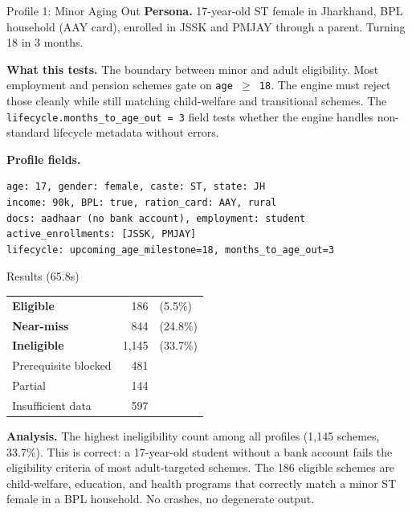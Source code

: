 \documentclass[11pt,a4paper]{article}
\newcommand{\ic}[1]{\texttt{\color{accent}#1}}
\begin{document}
\begin{profilebox}{Profile 1: Minor Aging Out}
\textbf{Persona.} 17-year-old ST female in Jharkhand, BPL household (AAY card), enrolled in JSSK and PMJAY through a parent. Turning 18 in 3 months.

\textbf{What this tests.} The boundary between minor and adult eligibility. Most employment and pension schemes gate on \ic{age $\geq$ 18}. The engine must reject those cleanly while still matching child-welfare and transitional schemes. The \ic{lifecycle.months\_to\_age\_out = 3} field tests whether the engine handles non-standard lifecycle metadata without errors.

\textbf{Profile fields.}
\begin{lstlisting}
age: 17, gender: female, caste: ST, state: JH
income: 90k, BPL: true, ration_card: AAY, rural
docs: aadhaar (no bank account), employment: student
active_enrollments: [JSSK, PMJAY]
lifecycle: upcoming_age_milestone=18, months_to_age_out=3
\end{lstlisting}

\begin{resultbox}{Results (65.8s)}
\begin{tabular}{@{}lrl@{}}
  \textcolor{eligible}{\textbf{Eligible}} & 186 & (5.5\%) \\
  \textcolor{nearmiss}{\textbf{Near-miss}} & 844 & (24.8\%) \\
  \textcolor{inelig}{\textbf{Ineligible}} & 1{,}145 & (33.7\%) \\
  Prerequisite blocked & 481 & \\
  Partial & 144 & \\
  Insufficient data & 597 & \\
\end{tabular}
\end{resultbox}

\textbf{Analysis.} The highest ineligibility count among all profiles (1{,}145 schemes, 33.7\%). This is correct: a 17-year-old student without a bank account fails the eligibility criteria of most adult-targeted schemes. The 186 eligible schemes are child-welfare, education, and health programs that correctly match a minor ST female in a BPL household. No crashes, no degenerate output.
\end{profilebox}
\end{document}
